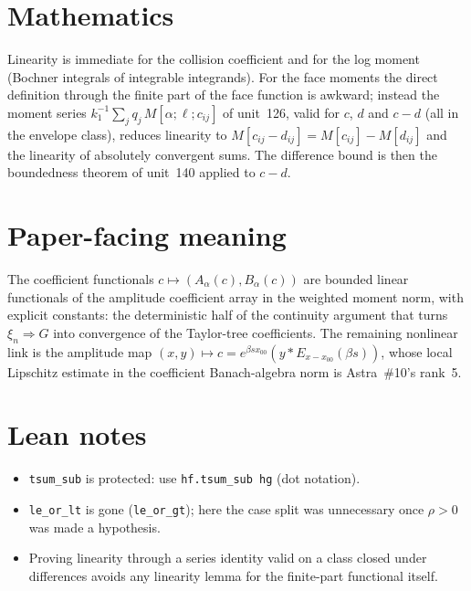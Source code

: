 \documentclass[11pt]{article}
\begin{document}
\section{Mathematics}

Linearity is immediate for the collision coefficient and for the log moment (Bochner integrals of
integrable integrands). For the face moments the direct definition through the finite part of the
face function is awkward; instead the moment series $k_1^{-1}\sum_jq_j\,M[\alpha;\ell;c_{ij}]$ of
unit~126, valid for $c$, $d$ and $c-d$ (all in the envelope class), reduces linearity to
$M[c_{ij}-d_{ij}]=M[c_{ij}]-M[d_{ij}]$ and the linearity of absolutely convergent sums. The
difference bound is then the boundedness theorem of unit~140 applied to $c-d$.

\section{Paper-facing meaning}

The coefficient functionals $c\mapsto(A_\alpha(c),B_\alpha(c))$ are bounded linear functionals of
the amplitude coefficient array in the weighted moment norm, with explicit constants: the
deterministic half of the continuity argument that turns $\xi_n\Rightarrow G$ into convergence of
the Taylor-tree coefficients. The remaining nonlinear link is the amplitude map
$(x,y)\mapsto c=e^{\beta sx_{00}}(y*E_{x-x_{00}}(\beta s))$, whose local Lipschitz estimate in the
coefficient Banach-algebra norm is Astra~\#10's rank~5.

\section{Lean notes}

\begin{itemize}
\item \texttt{tsum\_sub} is protected: use \texttt{hf.tsum\_sub hg} (dot notation).
\item \texttt{le\_or\_lt} is gone (\texttt{le\_or\_gt}); here the case split was unnecessary once
$\rho>0$ was made a hypothesis.
\item Proving linearity through a series identity valid on a class closed under differences avoids
any linearity lemma for the finite-part functional itself.
\end{itemize}
\end{document}
